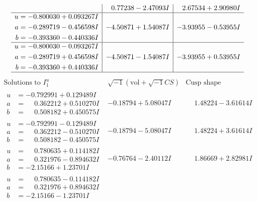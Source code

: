 \documentclass[1p]{elsarticle_modified}
\theoremstyle{definition}
\newcommand{\I}{\sqrt{-1}}
\begin{document}
$$\begin{array}{c|c|c}
 & \phantom{-}0.77238 - 2.47093 I & \phantom{-}2.67534 + 2.90980 I \\ \hline\begin{aligned}
u &= -0.800030 + 0.093267 I \\
a &= -0.289719 - 0.456598 I \\
b &= -0.393360 - 0.440336 I\end{aligned}
 & -4.50871 + 1.54087 I & -3.93955 - 0.53955 I \\ \hline\begin{aligned}
u &= -0.800030 - 0.093267 I \\
a &= -0.289719 + 0.456598 I \\
b &= -0.393360 + 0.440336 I\end{aligned}
 & -4.50871 - 1.54087 I & -3.93955 + 0.53955 I\\
 \hline 
 \end{array}$$\newpage$$\begin{array}{c|c|c}  
\text{Solutions to }I^u_{1}& \I (\text{vol} + \sqrt{-1}CS) & \text{Cusp shape}\\
 \hline 
\begin{aligned}
u &= -0.792991 + 0.129489 I \\
a &= \phantom{-}0.362212 + 0.510270 I \\
b &= \phantom{-}0.508182 + 0.450575 I\end{aligned}
 & -0.18794 + 5.08047 I & \phantom{-}1.48224 - 3.61614 I \\ \hline\begin{aligned}
u &= -0.792991 - 0.129489 I \\
a &= \phantom{-}0.362212 - 0.510270 I \\
b &= \phantom{-}0.508182 - 0.450575 I\end{aligned}
 & -0.18794 - 5.08047 I & \phantom{-}1.48224 + 3.61614 I \\ \hline\begin{aligned}
u &= \phantom{-}0.780635 + 0.114182 I \\
a &= \phantom{-}0.321976 - 0.894632 I \\
b &= -2.15166 + 1.23701 I\end{aligned}
 & -0.76764 - 2.40112 I & \phantom{-}1.86669 + 2.82981 I \\ \hline\begin{aligned}
u &= \phantom{-}0.780635 - 0.114182 I \\
a &= \phantom{-}0.321976 + 0.894632 I \\
b &= -2.15166 - 1.23701 I\end{aligned}

\end{array}$$
\end{document}
